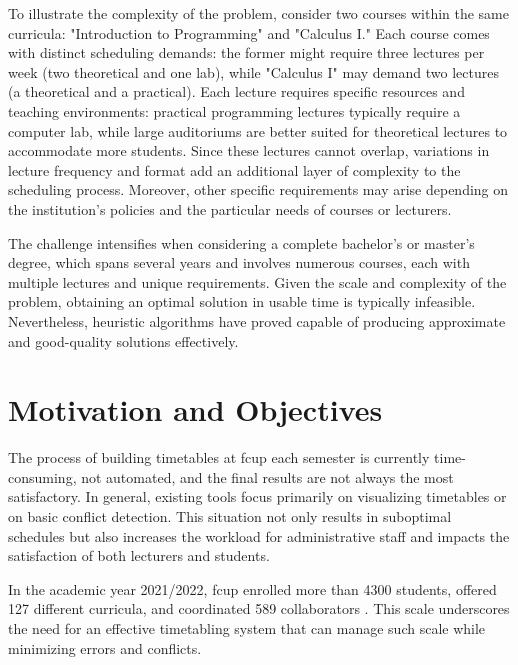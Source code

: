 To illustrate the complexity of the problem, consider two courses within the same curricula: "Introduction to Programming" and "Calculus I." Each course comes with distinct scheduling demands: the former might require three lectures per week (two theoretical and one lab), while "Calculus I" may demand two lectures (a theoretical and a practical). Each lecture requires specific resources and teaching environments: practical programming lectures typically require a computer lab, while large auditoriums are better suited for theoretical lectures to accommodate more students. Since these lectures cannot overlap, variations in lecture frequency and format add an additional layer of complexity to the scheduling process. %
Moreover, other specific requirements may arise depending on the institution’s policies and the particular needs of courses or lecturers.

The challenge intensifies when considering a complete bachelor’s or master’s degree, which spans several years and involves numerous courses, each with multiple lectures and unique requirements. Given the scale and complexity of the problem, obtaining an optimal solution in usable time is typically infeasible. Nevertheless, heuristic algorithms have proved capable of producing approximate and good-quality solutions effectively. 

\section{Motivation and Objectives}

The process of building timetables at \ac{fcup} each semester is currently time-consuming, not automated, and the final results are not always the most satisfactory. In general, existing tools focus primarily on visualizing timetables or on basic conflict detection. This situation not only results in suboptimal schedules but also increases the workload for administrative staff and impacts the satisfaction of both lecturers and students. 

In the academic year 2021/2022, \ac{fcup} enrolled more than 4300 students, offered 127 different curricula, and coordinated 589 collaborators \cite{fcup_em_numeros}. This scale underscores the need for an effective timetabling system that can manage such scale while minimizing errors and conflicts. %

